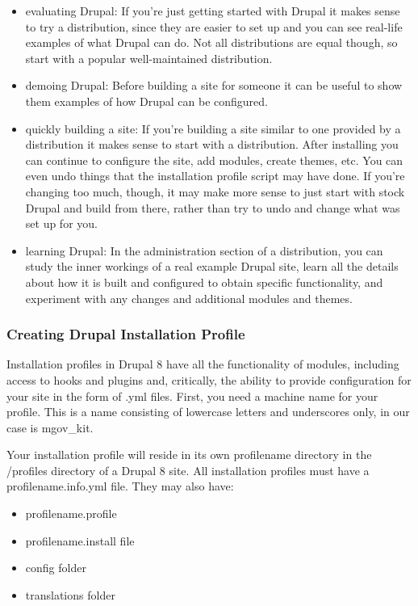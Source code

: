 \begin{itemize}
	\item evaluating Drupal: If you're just getting started with Drupal it makes sense to try a distribution, since they are easier to set up and you can see real-life examples of what Drupal can do. Not all distributions are equal though, so start with a popular well-maintained distribution.
	\item demoing Drupal: Before building a site for someone it can be useful to show them examples of how Drupal can be configured.
	\item quickly building a site: If you're building a site similar to one provided by a distribution it makes sense to start with a distribution. After installing you can continue to configure the site, add modules, create themes, etc. You can even undo things that the installation profile script may have done. If you're changing too much, though, it may make more sense to just start with stock Drupal and build from there, rather than try to undo and change what was set up for you.
	\item learning Drupal: In the administration section of a distribution, you can study the inner workings of a real example Drupal site, learn all the details about how it is built and configured to obtain specific functionality, and experiment with any changes and additional modules and themes.
\end{itemize}

\subsubsection{Creating Drupal Installation Profile}

Installation profiles in Drupal 8 have all the functionality of modules, including access to hooks and plugins and, critically, the ability to provide configuration for your site in the form of .yml files. First, you need a machine name for your profile. This is a name consisting of lowercase letters and underscores only, in our case is mgov\_kit.

Your installation profile will reside in its own profilename directory in the /profiles directory of a Drupal 8 site.
All installation profiles must have a profilename.info.yml file. They may also have:

\begin{itemize}
	\item profilename.profile
	\item profilename.install file
	\item config folder
	\item translations folder
\end{itemize}

